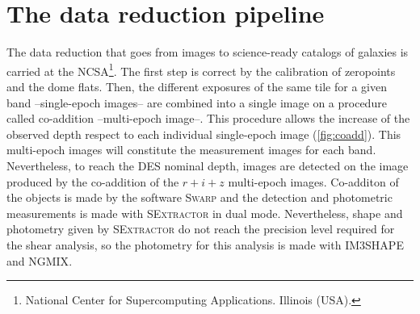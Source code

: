 \section{The data reduction pipeline}
The data reduction that goes from images to science-ready catalogs of galaxies is carried at the NCSA\footnote{National Center for Supercomputing Applications. Illinois (USA).}. The first step is correct by the calibration of zeropoints and the dome flats. Then, the different exposures of the same tile for a given band --single-epoch images-- are combined into a single image on a procedure called co-addition --multi-epoch image--. This procedure allows the increase of the observed depth respect to each individual single-epoch image (\autoref{fig:coadd}). This multi-epoch images will constitute the measurement images for each band. Nevertheless, to reach the DES nominal depth, images are detected on the image produced by the co-addition of the $r+i+z$ multi-epoch images. Co-additon of the objects is made by the software {\scshape Swarp} and the detection and photometric measurements is made with {\scshape SExtractor} in dual mode. Nevertheless, shape and photometry given by {\scshape SExtractor} do not reach the precision level required for the shear analysis, so the photometry for this analysis is made with {\scshape IM3SHAPE} and {\scshape NGMIX}.

